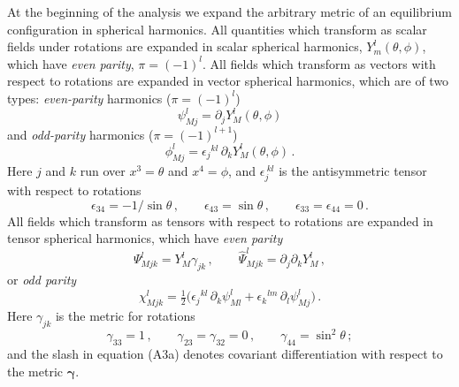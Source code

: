 \documentclass[12pt]{article}
\begin{document}
At the beginning of the analysis we expand the arbitrary metric of an equilibrium configuration in spherical harmonics. All quantities which transform as scalar fields under rotations are
expanded in scalar spherical harmonics, $Y^l_m(\theta, \phi)$, which have \emph{even parity}, $\pi = (-1)^l$.
All fields which transform as vectors with respect to rotations are expanded in vector spherical
harmonics, which are of two types: \emph{even-parity} harmonics ($\pi = (-1)^l$)
%
\begin{equation}
\psi^l_{Mj} = \partial_j Y^l_M(\theta, \phi)
\label{eq:A1a}
\tag{A1a}
\end{equation}
%
and \emph{odd-parity} harmonics ($\pi = (-1)^{l+1}$)
%
\begin{equation}
\phi^l_{Mj} = \epsilon_j{}^{kl}\, \partial_k Y^l_M(\theta, \phi) \,.
\label{eq:A1b}
\tag{A1b}
\end{equation}
%
Here $j$ and $k$ run over $x^3 = \theta$ and $x^4 = \phi$, and $\epsilon_j^{\ kl}$ is the antisymmetric tensor with respect to
rotations
%
\begin{equation}
\epsilon_{34} = -1/\sin\theta \,, \qquad
\epsilon_{43} = \sin\theta \,, \qquad
\epsilon_{33} = \epsilon_{44} = 0 \,.
\label{eq:A2}
\tag{A2}
\end{equation}
%
All fields which transform as tensors with respect to rotations are expanded in tensor spherical
harmonics, which have \emph{even parity}
%
\begin{equation}
\Psi^l_{Mjk} = Y^l_M \gamma_{jk} \,, \qquad
\hat{\Psi}^l_{Mjk} = \partial_j \partial_k Y^l_M \,,
\label{eq:A3a}
\tag{A3a}
\end{equation}
%
or \emph{odd parity}
%
\begin{equation}
\chi^l_{Mjk} = \tfrac{1}{2}\bigl(\epsilon_j{}^{kl}\, \partial_k \psi^l_{Ml}
+ \epsilon_k{}^{lm}\, \partial_l \psi^l_{Mj}\bigr) \,.
\label{eq:A3b}
\tag{A3b}
\end{equation}
%
Here $\gamma_{jk}$ is the metric for rotations
%
\begin{equation}
\gamma_{33} = 1 \,, \qquad
\gamma_{23} = \gamma_{32} = 0 \,, \qquad
\gamma_{44} = \sin^2\theta \,;
\label{eq:A4}
\tag{A4}
\end{equation}
%
and the slash in equation (A3a) denotes covariant differentiation with respect to the metric $\boldsymbol{\gamma}$.
\end{document}
